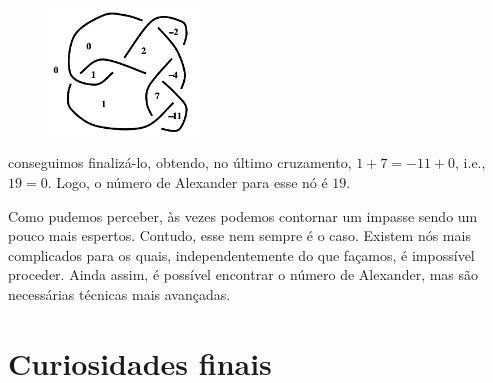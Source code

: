 \documentclass[a4paper,portuguese,11pt,twoside, leqno]{book}
\theoremstyle{definition}
\begin{document}
	\begin{figure}[H]
		\begin{center}
			\includegraphics[width=4cm]{Images/no_preenchimento_completo.png}
		\end{center}
	\end{figure}
	\par\vspace{0.3cm} conseguimos finalizá-lo, obtendo, no último cruzamento, $1+7=-11+0$, i.e., $19=0$. Logo, o número de Alexander para esse nó é $19$.
	\par\vspace{0.3cm} Como pudemos perceber, às vezes podemos contornar um impasse sendo um pouco mais espertos. Contudo, esse nem sempre é o caso. Existem nós mais complicados para os quais, independentemente do que façamos, é impossível proceder. Ainda assim, é possível encontrar o número de Alexander, mas são necessárias técnicas mais avançadas.
	\chapter{Curiosidades finais}
\end{document}
